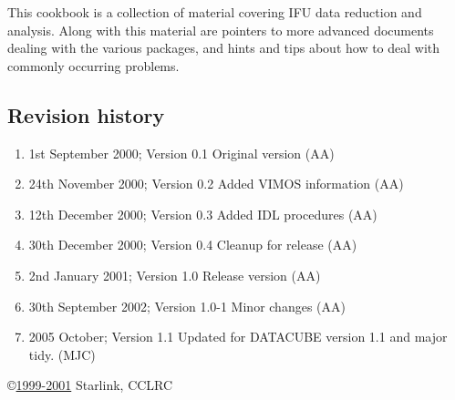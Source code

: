\documentclass[twoside,11pt]{article}
\newcommand{\stardocabstract}
{This cookbook is a collection of material covering IFU data reduction and analysis. Along 
with this material are pointers to more advanced documents dealing with the various packages,
and hints and tips about how to deal with commonly occurring problems.}
\begin{document}
\newenvironment{refs}{\vspace{-4ex} %
                      \begin{list}{}{\setlength{\topsep}{0mm}
                                     \setlength{\partopsep}{0mm}
                                     \setlength{\itemsep}{0mm}
                                     \setlength{\parsep}{0mm}
                                     \setlength{\leftmargin}{1.5em}
                                     \setlength{\itemindent}{-\leftmargin}
                                     \setlength{\labelsep}{0mm}
                                     \setlength{\labelwidth}{0mm}}
                    }{\end{list}}



\stardocabstract
 \newpage
 \vspace{3cm}

 \subsection*{Revision history}

 \begin{enumerate}
   \item 1st September 2000; Version 0.1 Original version (AA) 
   \item 24th November 2000; Version 0.2 Added VIMOS information (AA)
   \item 12th December 2000; Version 0.3 Added IDL procedures (AA)
   \item 30th December 2000; Version 0.4 Cleanup for release (AA)
   \item 2nd January 2001; Version 1.0 Release version (AA)
   \item 30th September 2002; Version 1.0-1 Minor changes (AA)
   \item 2005 October; Version 1.1  Updated for DATACUBE version 1.1
                                    and major tidy. (MJC)

 \end{enumerate}

 \vspace{10cm}
 \copyright \underline{1999-2001} Starlink, CCLRC
\end{document}
